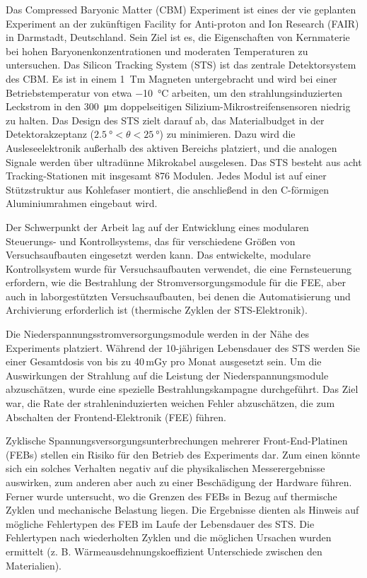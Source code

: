 Das Compressed Baryonic Matter (\gls{CBM}) Experiment ist eines der vie geplanten Experiment an der zukünftigen Facility for Anti-proton and Ion Research (FAIR) in Darmstadt, Deutschland. Sein Ziel ist es, die Eigenschaften von Kernmaterie bei hohen Baryonenkonzentrationen und moderaten Temperaturen zu untersuchen. Das Silicon Tracking System (\gls{STS}) ist das zentrale Detektorsystem des \gls{CBM}. Es ist in einem 1~Tm Magneten untergebracht und wird bei einer Betriebstemperatur von etwa \SI{-10}{\celsius} arbeiten, um den strahlungsinduzierten Leckstrom in den \SI{300}{\micro\metre} doppelseitigen Silizium-Mikrostreifensensoren niedrig zu halten. Das Design des \gls{STS} zielt darauf ab, das Materialbudget in der Detektorakzeptanz ($\SI{2.5}{\degree} < \theta < \SI{25}{\degree}$) zu minimieren. Dazu wird die Ausleseelektronik außerhalb des aktiven Bereichs platziert, und die analogen Signale werden über ultradünne Mikrokabel ausgelesen. Das \gls{STS} besteht aus acht Tracking-Stationen mit  insgesamt 876 Modulen. Jedes Modul ist auf einer Stützstruktur aus Kohlefaser montiert, die anschließend in den C-förmigen Aluminiumrahmen eingebaut wird. 

Der Schwerpunkt der Arbeit lag auf der Entwicklung eines modularen Steuerungs- und Kontrollsystems, das für verschiedene Größen von Versuchsaufbauten eingesetzt werden kann. Das entwickelte, modulare Kontrollsystem wurde für Versuchsaufbauten verwendet, die eine Fernsteuerung erfordern, wie die Bestrahlung der Stromversorgungsmodule für die \gls{FEE}, aber auch in laborgestützten Versuchsaufbauten, bei denen die Automatisierung und Archivierung erforderlich ist (thermische Zyklen der \gls{STS}-Elektronik).

Die Niederspannungsstromversorgungsmodule werden in der Nähe des Experiments platziert. Während der 10-jährigen Lebensdauer des \gls{STS} werden Sie einer Gesamtdosis von bis zu 40\,mGy pro Monat ausgesetzt sein. Um die Auswirkungen der Strahlung auf die Leistung der Niederspannungsmodule abzuschätzen, wurde eine spezielle Bestrahlungskampagne durchgeführt. Das Ziel war, die Rate der strahleninduzierten weichen Fehler abzuschätzen, die zum Abschalten der Frontend-Elektronik (\gls{FEE}) führen.

Zyklische Spannungsversorgungsunterbrechungen mehrerer Front-End-Platinen (\glspl{FEB}) stellen ein Risiko für den Betrieb des Experiments dar. Zum einen könnte sich ein solches Verhalten negativ auf die physikalischen Messerergebnisse auswirken, zum anderen aber auch zu einer Beschädigung der Hardware führen. Ferner wurde untersucht, wo die Grenzen des \glspl{FEB} in Bezug auf thermische Zyklen und mechanische Belastung liegen. Die Ergebnisse dienten als Hinweis auf mögliche Fehlertypen des \gls{FEB} im Laufe der Lebensdauer des \gls{STS}. Die Fehlertypen nach wiederholten Zyklen und die möglichen Ursachen wurden ermittelt (z. B. Wärmeausdehnungskoeffizient Unterschiede zwischen den Materialien). 

